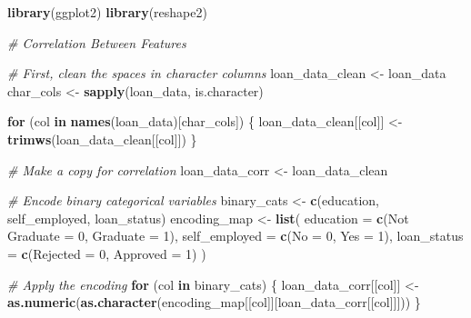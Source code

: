 \documentclass[
]{article}
\newenvironment{Shaded}{\begin{snugshade}}{\end{snugshade}}
\newcommand{\AttributeTok}[1]{\textcolor[rgb]{0.13,0.29,0.53}{#1}}
\newcommand{\CommentTok}[1]{\textcolor[rgb]{0.56,0.35,0.01}{\textit{#1}}}
\newcommand{\ControlFlowTok}[1]{\textcolor[rgb]{0.13,0.29,0.53}{\textbf{#1}}}
\newcommand{\DecValTok}[1]{\textcolor[rgb]{0.00,0.00,0.81}{#1}}
\newcommand{\FunctionTok}[1]{\textcolor[rgb]{0.13,0.29,0.53}{\textbf{#1}}}
\newcommand{\NormalTok}[1]{#1}
\newcommand{\OtherTok}[1]{\textcolor[rgb]{0.56,0.35,0.01}{#1}}
\newcommand{\StringTok}[1]{\textcolor[rgb]{0.31,0.60,0.02}{#1}}
\begin{document}
\begin{Shaded}
\begin{Highlighting}[]
\FunctionTok{library}\NormalTok{(ggplot2)}
\FunctionTok{library}\NormalTok{(reshape2)}

\CommentTok{\# Correlation Between Features}


\CommentTok{\# First, clean the spaces in character columns}
\NormalTok{loan\_data\_clean }\OtherTok{\textless{}{-}}\NormalTok{ loan\_data}
\NormalTok{char\_cols }\OtherTok{\textless{}{-}} \FunctionTok{sapply}\NormalTok{(loan\_data, is.character)}

\ControlFlowTok{for}\NormalTok{ (col }\ControlFlowTok{in} \FunctionTok{names}\NormalTok{(loan\_data)[char\_cols]) \{}
\NormalTok{  loan\_data\_clean[[col]] }\OtherTok{\textless{}{-}} \FunctionTok{trimws}\NormalTok{(loan\_data\_clean[[col]])}
\NormalTok{\}}

\CommentTok{\# Make a copy for correlation}
\NormalTok{loan\_data\_corr }\OtherTok{\textless{}{-}}\NormalTok{ loan\_data\_clean}

\CommentTok{\# Encode binary categorical variables}
\NormalTok{binary\_cats }\OtherTok{\textless{}{-}} \FunctionTok{c}\NormalTok{(}\StringTok{\textquotesingle{}education\textquotesingle{}}\NormalTok{, }\StringTok{\textquotesingle{}self\_employed\textquotesingle{}}\NormalTok{, }\StringTok{\textquotesingle{}loan\_status\textquotesingle{}}\NormalTok{)}
\NormalTok{encoding\_map }\OtherTok{\textless{}{-}} \FunctionTok{list}\NormalTok{(}
  \AttributeTok{education =} \FunctionTok{c}\NormalTok{(}\StringTok{\textquotesingle{}Not Graduate\textquotesingle{}} \OtherTok{=} \DecValTok{0}\NormalTok{, }\StringTok{\textquotesingle{}Graduate\textquotesingle{}} \OtherTok{=} \DecValTok{1}\NormalTok{),}
  \AttributeTok{self\_employed =} \FunctionTok{c}\NormalTok{(}\StringTok{\textquotesingle{}No\textquotesingle{}} \OtherTok{=} \DecValTok{0}\NormalTok{, }\StringTok{\textquotesingle{}Yes\textquotesingle{}} \OtherTok{=} \DecValTok{1}\NormalTok{),}
  \AttributeTok{loan\_status =} \FunctionTok{c}\NormalTok{(}\StringTok{\textquotesingle{}Rejected\textquotesingle{}} \OtherTok{=} \DecValTok{0}\NormalTok{, }\StringTok{\textquotesingle{}Approved\textquotesingle{}} \OtherTok{=} \DecValTok{1}\NormalTok{)}
\NormalTok{)}

\CommentTok{\# Apply the encoding}
\ControlFlowTok{for}\NormalTok{ (col }\ControlFlowTok{in}\NormalTok{ binary\_cats) \{}
\NormalTok{  loan\_data\_corr[[col]] }\OtherTok{\textless{}{-}} \FunctionTok{as.numeric}\NormalTok{(}\FunctionTok{as.character}\NormalTok{(encoding\_map[[col]][loan\_data\_corr[[col]]]))}
\NormalTok{\}}


\end{Highlighting}
\end{Shaded}
\end{document}
